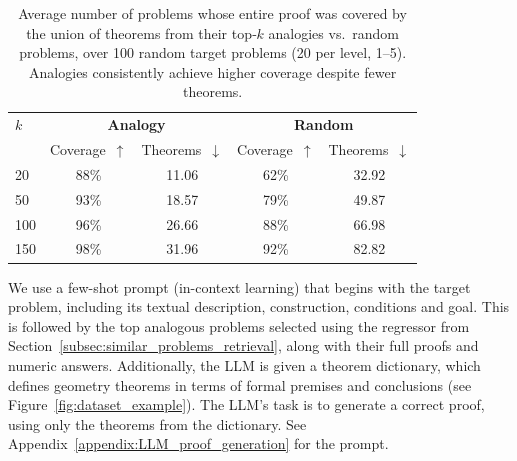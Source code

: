 \begin{table}[!t]
    \centering
    \small
    \setlength{\tabcolsep}{4pt} 
    \begin{tabular}{l cc cc}
        \toprule
        \textbf{$k$} & \multicolumn{2}{c}{\textbf{Analogy}} & \multicolumn{2}{c}{\textbf{Random}} \\
        & Coverage~$\uparrow$ & Theorems~$\downarrow$ & Coverage~$\uparrow$  & Theorems~$\downarrow$  \\
        \midrule
        20 & 88\% & 11.06 & 62\% & 32.92 \\
        \midrule
        50 & 93\% & 18.57 & 79\% & 49.87 \\
        \midrule
        100 & 96\% & 26.66 & 88\% & 66.98 \\
        \midrule
        150 & 98\% & 31.96 & 92\% & 82.82 \\
        \bottomrule
    \end{tabular}
    \caption{Average number of problems whose entire proof was covered by the union of theorems from their top‑$k$ analogies vs.~random problems, over 100 random target problems (20 per level, 1–5). %
    Analogies consistently achieve higher coverage despite fewer theorems.}
    \label{tab:theorems_coverage}
\end{table}







We use a few-shot prompt (in-context learning) that begins with the target problem, including its textual description, construction, conditions and goal. This is followed by the top analogous problems selected using the regressor from Section~\ref{subsec:similar_problems_retrieval}, along with their full proofs and numeric answers.
%
%
%
Additionally, the LLM is given a theorem dictionary, which defines geometry theorems in terms of formal premises and conclusions (see Figure~\ref{fig:dataset_example}). The LLM's task is to generate a correct proof, using only the theorems from the dictionary. See Appendix~\ref{appendix:LLM_proof_generation} for the prompt.


